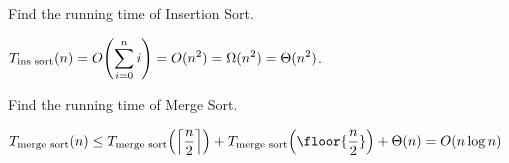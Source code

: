 \documentclass[11pt]{scrartcl}
\theoremstyle{dotlessP}
\theoremstyle{dotlessN}
\DeclarePairedDelimiter\ceil{\lceil}{\rceil} %
\DeclarePairedDelimiter\paren{(}{)} %
\begin{document}
\begin{example}
	Find the running time of Insertion Sort.
\end{example}
\begin{soln}
	$T_{\text{ins sort}}(n) = \displaystyle O\paren*{\sum_{i=0}^n i} = O(n^2) = \Omega(n^2) = \Theta(n^2)$.
\end{soln}
\begin{example}
	Find the running time of Merge Sort.
\end{example}
\begin{soln}
	$T_{\text{merge sort}}(n) \displaystyle \leq T_{\text{merge sort}}\paren*{\ceil*{\frac{n}{2}}} + T_{\text{merge sort}}\paren*{\floor{\frac{n}{2}}} + \Theta(n) = O(n\log n)$
\end{soln}
\end{document}
